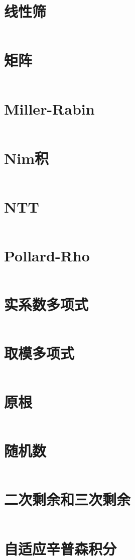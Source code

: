 \section{线性筛}
\inputminted{cpp}{\source/zhongzihao/shai.cpp}
\section{矩阵}
\inputminted{cpp}{\source/zhongzihao/matrix.cpp}
\section{Miller-Rabin}
\inputminted{cpp}{\source/zhongzihao/millerrabin.cpp}
\section{Nim积}
\inputminted{cpp}{\source/zhongzihao/nimprod.cpp}
\section{NTT}
\inputminted{cpp}{\source/zhongzihao/ntt.cpp}
\section{Pollard-Rho}
\inputminted{cpp}{\source/zhongzihao/pollardrho.cpp}
\section{实系数多项式}
\inputminted{cpp}{\source/zhongzihao/polynomial.cpp}
\section{取模多项式}
\inputminted{cpp}{\source/zhongzihao/polynomialmod.cpp}
\section{原根}
\inputminted{cpp}{\source/zhongzihao/primitiveroot.cpp}
\section{随机数}
\inputminted{cpp}{\source/zhongzihao/random.cpp}
\section{二次剩余和三次剩余}
\inputminted{cpp}{\source/zhongzihao/remain.cpp}
\section{自适应辛普森积分}
\inputminted{cpp}{\source/zhongzihao/simpson.cpp}
